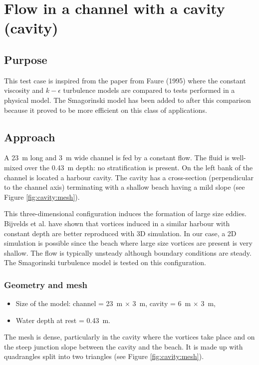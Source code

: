 \chapter{Flow in a channel with a cavity (cavity)}

\section{Purpose}
This test case is inspired from the paper from Faure (1995)
\cite{Faure1995} where the constant viscosity and $k-\epsilon$ turbulence models
are compared to tests performed in a physical model. The Smagorinski model has
been added to  after this comparison because it proved to be more
efficient on this class of applications.

\section{Approach}
A 23~m long and 3~m wide channel is fed by a constant flow. The fluid
is well-mixed over the 0.43~m depth: no stratification is present. On the
left bank of the channel is located a harbour cavity. The cavity has a
cross-section (perpendicular to the channel axis) terminating with a shallow
beach having a mild slope (see Figure \ref{fig:cavity:mesh}).

This three-dimensional configuration induces the formation of large size
eddies. Bijvelds et al. \cite{Bijvelds1997} have shown that vortices induced in
a similar harbour with constant depth are better reproduced with 3D
simulation. In our case, a 2D simulation is possible since the beach where
large size vortices are present is very shallow. The flow is typically unsteady
although boundary conditions are steady. The Smagorinski turbulence model is
tested on this configuration.

\subsection{Geometry and mesh}

\begin{itemize}
\item Size of the model: channel = 23~m $\times$ 3~m, cavity = 6~m $\times$ 3~m,
\item Water depth at rest = 0.43~m.
\end{itemize}

The mesh is dense, particularly in the cavity where the vortices take place and
on the steep junction slope between the cavity and the beach. It is made up
with quadrangles split into two triangles (see Figure \ref{fig:cavity:mesh}).

